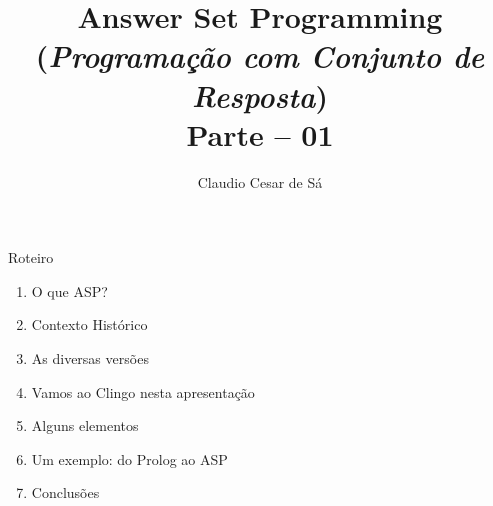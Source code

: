 \documentclass{beamer}
\title[Inteligência Artificial -- Otimização Combinatória] %
{Answer Set Programming \\ (\textit{Programação com Conjunto de Resposta})\\ Parte -- 01}
\author[Claudio Cesar de Sá] %
{Claudio Cesar de Sá\inst{1}}
\institute[UDESC]{Pesquisador Independente}
\date[\today] %
\begin{document}
\begin{frame}
  \titlepage
\end{frame}








\begin{frame}

\begin{block}{Roteiro}

\begin{enumerate}

  \item  O que ASP?
  \item  Contexto Histórico
  \item  As diversas versões
  \item  Vamos ao Clingo nesta apresentação
  \item  Alguns elementos
  \item  Um exemplo: do Prolog ao ASP
  \item Conclusões
  \end{enumerate}

\end{block}

\end{frame}
\end{document}
